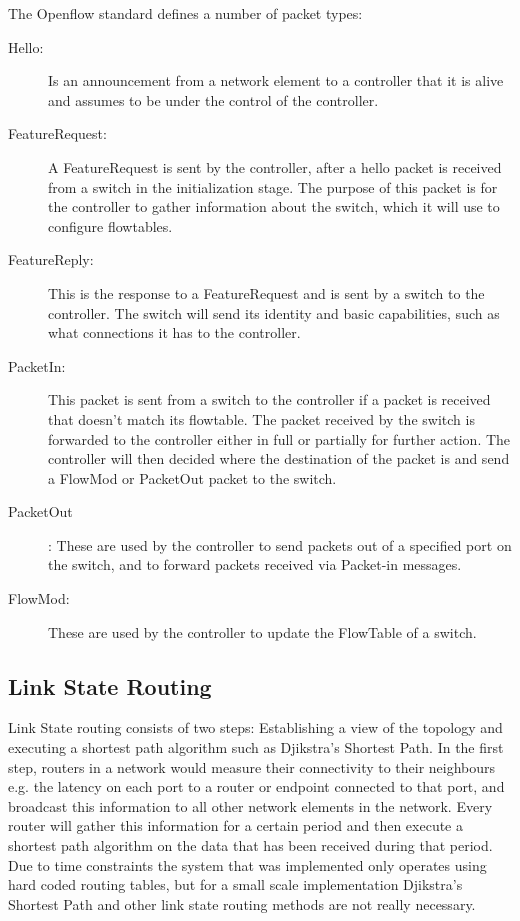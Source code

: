 \documentclass{article}
\begin{document}
The Openflow standard defines a number of packet types:
\begin{description}
	\item [Hello:] Is an announcement from a network element to a controller that it is alive and assumes to be under the control of the controller.
	\item [FeatureRequest:] A FeatureRequest is sent by the controller, after a hello packet is received from a switch in the initialization stage. The purpose of this packet is for the controller to gather information about the switch, which it will use to configure flowtables.
	\item [FeatureReply:] This is the response to a FeatureRequest and is sent by a switch to the controller. The switch will send its identity and basic capabilities, such as what connections it has to the controller.
	\item [PacketIn:] This packet is sent from a switch to the controller if a packet is received that doesn't match its flowtable. The packet received by the switch is forwarded to the controller either in full or partially for further action. The controller will then decided where the destination of the packet is and send a FlowMod or PacketOut packet to the switch. 
	\item [PacketOut]: These are used by the controller to send packets out of a specified port on the switch, and to forward packets received via Packet-in messages.
	\item [FlowMod:] These are used by the controller to update the FlowTable of a switch.
\end{description}


\subsection{Link State Routing}

Link State routing consists of two steps: Establishing a view of the topology and executing a shortest path algorithm such as Djikstra's Shortest Path. In the first step, routers in a network would measure their connectivity to their neighbours e.g. the latency on each port to a router or endpoint connected to that port, and broadcast this information to all other network elements in the network. Every router will gather this information for a certain period and then execute a shortest path algorithm on the data that has been received during that period. 
\newline
\newline
Due to time constraints the system that was implemented only operates using hard coded routing tables, but for a small scale implementation Djikstra's Shortest Path and other link state routing methods are not really necessary.
\end{document}
